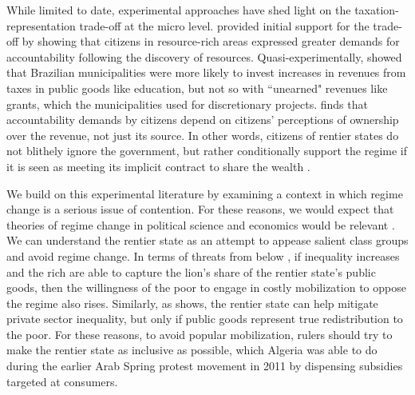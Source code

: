 \documentclass[12pt, letterpaper]{article}
\begin{document}
While limited to date, experimental approaches have shed light on the taxation-representation trade-off at the micro level. \textcite{paler_keeping_2013} provided initial support for the trade-off by showing that citizens in resource-rich areas expressed greater demands for accountability following the discovery of resources. Quasi-experimentally, \textcite{gadenne_tax_2017} showed that Brazilian municipalities were more likely to invest increases in revenues from taxes in public goods like education, but not so with ``unearned" revenues like grants, which the municipalities used for discretionary projects. \textcite{de_la_cuesta_oil_2019} finds that accountability demands by citizens depend on citizens' perceptions of ownership over the revenue, not just its source. In other words, citizens of rentier states do not blithely ignore the government, but rather conditionally support the regime if it is seen as meeting its implicit contract to share the wealth \parencite[67]{ross_oil_2012}. 


We build on this experimental literature by examining a context in which regime change is a serious issue of contention. For these reasons, we would expect that theories of regime change in political science and economics would be relevant \parencite{acemoglu_economic_2006,boix_democracy_2003,acemoglu_persistence_2008}. We can understand the rentier state as an attempt to appease salient class groups and avoid regime change. In terms of threats from below \parencite{przeworski_conquered_2009}, if inequality increases and the rich are able to capture the lion's share of the rentier state's public goods, then the willingness of the poor to engage in costly mobilization to oppose the regime also rises. Similarly, as \textcite{dunning_crude_2008} shows, the rentier state can help mitigate private sector inequality, but only if public goods represent true redistribution to the poor. For these reasons, to avoid popular mobilization, rulers should try to make the rentier state as inclusive as possible, which Algeria was able to do during the earlier Arab Spring protest movement in 2011 by dispensing subsidies targeted at consumers. 
\end{document}
